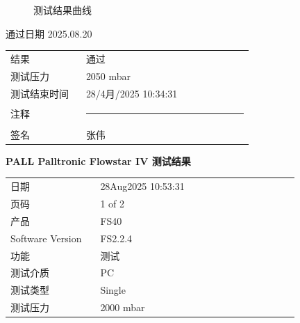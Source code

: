 \documentclass[UTF8,10pt,a4paper,fontset=fandol]{ctexart}
\newcommand{\fieldvalue}[1]{#1}
\newcommand{\handwritten}[1]{#1}
\begin{document}
\begin{figure}[ht]
\centering
{}
\caption{测试结果曲线}
\end{figure}

\handwritten{通过日期 2025.08.20}

\begin{tabular}{@{}p{0.28\linewidth}p{0.62\linewidth}@{}}
结果 &
\fieldvalue{通过}
\\[3pt]
测试压力 &
\fieldvalue{2050 mbar}
\\[3pt]
测试结束时间 &
\fieldvalue{28/4月/2025 10:34:31}
\\[3pt]
注释 & \rule{0.62\linewidth}{0.4pt}
\\[3pt]
签名 &
\fieldvalue{\handwritten{张伟}}
\end{tabular}


\newpage

\begin{center}
\textbf{PALL Palltronic Flowstar IV 测试结果}
\end{center}

\begin{tabular}{@{}p{0.28\linewidth}p{0.62\linewidth}@{}}
日期 &
\fieldvalue{28Aug2025 10:53:31} \\[2pt]
页码 &
\fieldvalue{1 of 2} \\[2pt]
产品 &
\fieldvalue{FS40} \\[2pt]
Software Version &
\fieldvalue{FS2.2.4} \\[2pt]
功能 &
\fieldvalue{测试} \\[2pt]
测试介质 &
\fieldvalue{PC} \\[2pt]
测试类型 &
\fieldvalue{Single} \\[2pt]
测试压力 &
\fieldvalue{2000 mbar} \\
\end{tabular}
\end{document}
